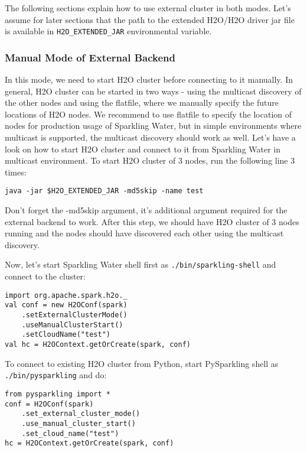 The following sections explain how to use external cluster in both modes. Let's assume for later sections that the path to the extended H2O/H2O driver jar file is available in \texttt{H2O\_EXTENDED\_JAR} environmental variable.

\subsubsection{Manual Mode of External Backend}

In this mode, we need to start H2O cluster before connecting to it manually. In general, H2O cluster can be started in two ways - using the multicast discovery of the other nodes and using the flatfile, where we manually specify the future locations of H2O nodes. We recommend to use flatfile to specify the location of nodes for production usage of Sparkling Water, but in simple environments where multicast is supported, the multicast discovery should work as well.
Let's have a look on how to start H2O cluster and connect to it from Sparkling Water in multicast environment. To start H2O cluster of 3 nodes, run the following line 3 times:

\begin{lstlisting}[style=Bash]
java -jar $H2O_EXTENDED_JAR -md5skip -name test
\end{lstlisting}

Don't forget the -md5skip argument, it's additional argument required for the external backend to work. After this step,
we should have H2O cluster of 3 nodes running and the nodes should have discovered each other using the multicast discovery.

Now, let's start Sparkling Water shell first as \texttt{./bin/sparkling-shell} and connect to the cluster:

\begin{lstlisting}[style=Scala]
import org.apache.spark.h2o._
val conf = new H2OConf(spark)
    .setExternalClusterMode()
    .useManualClusterStart()
    .setCloudName("test")
val hc = H2OContext.getOrCreate(spark, conf)
\end{lstlisting}

To connect to existing H2O cluster from Python, start PySparkling shell as \texttt{./bin/pysparkling} and do:

\begin{lstlisting}[style=Scala]
from pysparkling import *
conf = H2OConf(spark)
    .set_external_cluster_mode()
    .use_manual_cluster_start()
    .set_cloud_name("test")
hc = H2OContext.getOrCreate(spark, conf)
\end{lstlisting}

